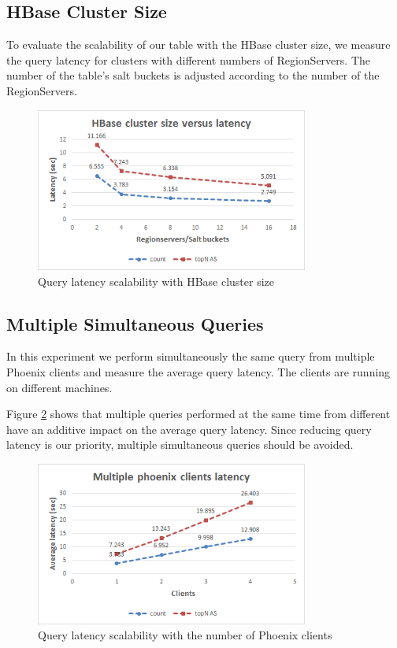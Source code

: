 \subsection{HBase Cluster Size}

To evaluate the scalability of our table with the HBase cluster size, we measure the query latency for clusters with different numbers of RegionServers. The number of the table's salt buckets is adjusted according to the number of the RegionServers.

\begin{figure}[H]
\centering
\includegraphics[width=0.8\textwidth]{figures/benchmarks_hbase_scalability_latency}
\caption{Query latency scalability with HBase cluster size}
\label{figure:benchmarks_hbase_scalability_latency}
\end{figure}

\subsection{Multiple Simultaneous Queries}

In this experiment we perform simultaneously the same query from multiple Phoenix clients and measure the average query latency. The clients are running on different machines. 

Figure \ref{figure:benchmarks_hbase_phoenix_clients} shows that multiple queries performed at the same time from different have an additive impact on the average query latency. Since reducing query latency is our priority, multiple simultaneous queries should be avoided.

\begin{figure}[H]
\centering
\includegraphics[width=0.8\textwidth]{figures/benchmarks_hbase_phoenix_clients}
\caption{Query latency scalability with the number of Phoenix clients}
\label{figure:benchmarks_hbase_phoenix_clients}
\end{figure}


\cleardoublepage
